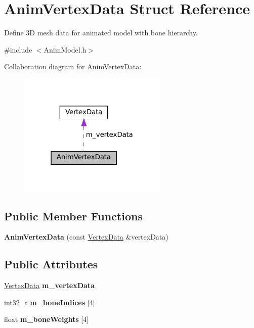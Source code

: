 \hypertarget{structAnimVertexData}{}\section{Anim\+Vertex\+Data Struct Reference}
\label{structAnimVertexData}


Define 3D mesh data for animated model with bone hierarchy.  




{\ttfamily \#include $<$Anim\+Model.\+h$>$}



Collaboration diagram for Anim\+Vertex\+Data\+:
\nopagebreak
\begin{figure}[H]
\begin{center}
\leavevmode
\includegraphics[width=202pt]{structAnimVertexData__coll__graph}
\end{center}
\end{figure}
\subsection*{Public Member Functions}
\begin{DoxyCompactItemize}
\item 
\mbox{\label{structAnimVertexData_a1e40cc145ac05a4592808aacf386dac9}} 
{\bfseries Anim\+Vertex\+Data} (const \hyperlink{structVertexData}{Vertex\+Data} \&vertex\+Data)
\end{DoxyCompactItemize}
\subsection*{Public Attributes}
\begin{DoxyCompactItemize}
\item 
\mbox{\label{structAnimVertexData_a128ebc399fe151b2581260866b4be3fd}} 
\hyperlink{structVertexData}{Vertex\+Data} {\bfseries m\+\_\+vertex\+Data}
\item 
\mbox{\label{structAnimVertexData_af3182e3c64d06876913bc91e5ddc24ff}} 
int32\+\_\+t {\bfseries m\+\_\+bone\+Indices} \mbox{[}4\mbox{]}
\item 
\mbox{\label{structAnimVertexData_a2eebb4c79533a02a0cf9c4c2f50e1b2e}} 
float {\bfseries m\+\_\+bone\+Weights} \mbox{[}4\mbox{]}
\end{DoxyCompactItemize}


